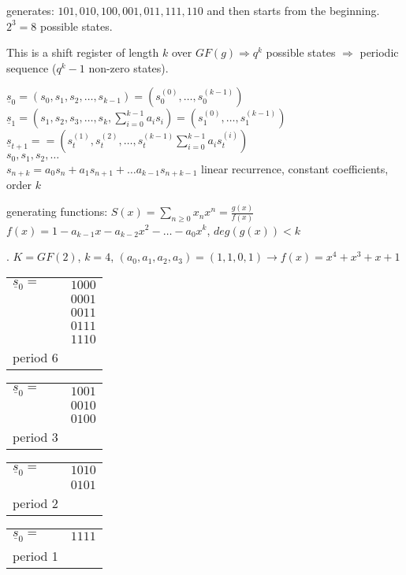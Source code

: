 generates: $101,010,100,001,011,111,110$ and then starts from the beginning. $2^3=8$ possible states.


This is a shift register of length $k$ over $GF(g) \Rightarrow q^k$ possible states $\Rightarrow$ periodic sequence ($q^k -1$ non-zero states).

$\underline{s}_0 = (s_0,s_1,s_2, \ldots, s_{k-1}) = (s_0^{(0)}, \ldots, s_0^{(k-1)})$\\
$\underline{s}_1 = (s_1,s_2,s_3, \ldots, s_{k}, \sum_{i=0}^{k-1}a_is_i) = (s_1^{(0)}, \ldots, s_1^{(k-1)})$\\
$\underline{s}_{t+1} =  = (s_t^{(1)}, s_t^{(2)}, \ldots, s_t^{(k-1)} \sum_{i=0}^{k-1}a_is_t^{(i)})$\\

$s_0,s_1,s_2,\ldots$\\
$s_{n+k} = a_0s_n + a_1 s_{n+1} + \ldots a_{k-1}s_{n+k-1}$ linear recurrence, constant coefficients, order $k$

generating functions: $S(x) = \sum_{n\geq 0}x_nx^n = \frac{g(x)}{f(x)}$\\
$f(x) = 1 -a_{k-1}x - a_{k-2}x^2 - \ldots -a_0 x^k$, $deg(g(x)) <k$

\Example.
$K=GF(2)$, $k=4$, $(a_0,a_1,a_2,a_3) = (1,1,0,1) \to f(x) = x^4 +x^3+x+1$

\begin{tabular}{ll}
  $\underline{s}_0 =$ & $1000$\\
                      & $0001$\\
                      & $0011$\\
                      & $0111$\\
                      & $1110$\\
  period 6
\end{tabular}
\begin{tabular}{ll}
  $\underline{s}_0 =$ & $1001$\\
                      & $0010$\\
                      & $0100$\\
  period 3
\end{tabular}
\begin{tabular}{ll}
  $\underline{s}_0 =$ & $1010$\\
                      & $0101$\\
  period 2
\end{tabular}
\begin{tabular}{ll}
  $\underline{s}_0 =$ & $1111$\\
  period 1
\end{tabular}

